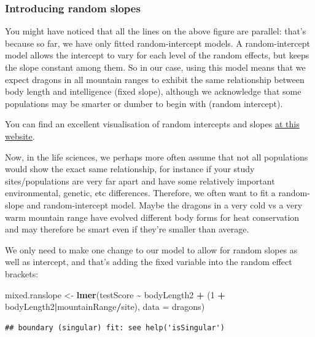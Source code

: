 \documentclass[
]{article}
\newenvironment{Shaded}{\begin{snugshade}}{\end{snugshade}}
\newcommand{\AttributeTok}[1]{\textcolor[rgb]{0.13,0.29,0.53}{#1}}
\newcommand{\DecValTok}[1]{\textcolor[rgb]{0.00,0.00,0.81}{#1}}
\newcommand{\FunctionTok}[1]{\textcolor[rgb]{0.13,0.29,0.53}{\textbf{#1}}}
\newcommand{\NormalTok}[1]{#1}
\newcommand{\OtherTok}[1]{\textcolor[rgb]{0.56,0.35,0.01}{#1}}
\newcommand{\SpecialCharTok}[1]{\textcolor[rgb]{0.81,0.36,0.00}{\textbf{#1}}}
\begin{document}
\subsubsection{Introducing random
slopes}\label{introducing-random-slopes}

You might have noticed that all the lines on the above figure are
parallel: that's because so far, we have only fitted random-intercept
models. A random-intercept model allows the intercept to vary for each
level of the random effects, but keeps the slope constant among them. So
in our case, using this model means that we expect dragons in all
mountain ranges to exhibit the same relationship between body length and
intelligence (fixed slope), although we acknowledge that some
populations may be smarter or dumber to begin with (random intercept).

You can find an excellent visualisation of random intercepts and slopes
\href{https://mfviz.com/hierarchical-models/}{at this website}.

Now, in the life sciences, we perhaps more often assume that not all
populations would show the exact same relationship, for instance if your
study sites/populations are very far apart and have some relatively
important environmental, genetic, etc differences. Therefore, we often
want to fit a random-slope and random-intercept model. Maybe the dragons
in a very cold vs a very warm mountain range have evolved different body
forms for heat conservation and may therefore be smart even if they're
smaller than average.

We only need to make one change to our model to allow for random slopes
as well as intercept, and that's adding the fixed variable into the
random effect brackets:

\begin{Shaded}
\begin{Highlighting}[]
\NormalTok{mixed.ranslope }\OtherTok{\textless{}{-}} \FunctionTok{lmer}\NormalTok{(testScore }\SpecialCharTok{\textasciitilde{}}\NormalTok{ bodyLength2 }\SpecialCharTok{+}\NormalTok{ (}\DecValTok{1} \SpecialCharTok{+}\NormalTok{ bodyLength2}\SpecialCharTok{|}\NormalTok{mountainRange}\SpecialCharTok{/}\NormalTok{site), }\AttributeTok{data =}\NormalTok{ dragons)}
\end{Highlighting}
\end{Shaded}

\begin{verbatim}
## boundary (singular) fit: see help('isSingular')
\end{verbatim}
\end{document}
